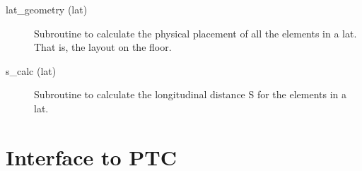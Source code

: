 \begin{description}

\item[lat_geometry (lat)] \Newline
Subroutine to calculate the physical placement of all the elements in a lat. 
That is, the layout on the floor. 

\item[s_calc (lat)] \Newline
Subroutine to calculate the longitudinal distance S for the elements in a lat. 

\end{description}

\section{Interface to PTC}
\label{r:ptc}      


